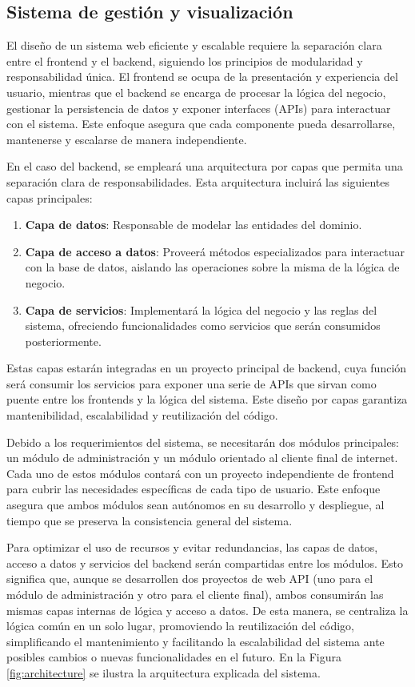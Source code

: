 \subsection{Sistema de gestión y visualización}
El diseño de un sistema web eficiente y escalable requiere la separación clara entre el frontend y el backend, 
siguiendo los principios de modularidad y responsabilidad única. El frontend se ocupa de la presentación y 
experiencia del usuario, mientras que el backend se encarga de procesar la lógica del negocio, gestionar la 
persistencia de datos y exponer interfaces (APIs) para interactuar con el sistema. Este enfoque asegura que 
cada componente pueda desarrollarse, mantenerse y escalarse de manera independiente.

En el caso del backend, se empleará una arquitectura por capas que permita una separación clara de responsabilidades. 
Esta arquitectura incluirá las siguientes capas principales:

\begin{enumerate}
    \item \textbf{Capa de datos}: Responsable de modelar las entidades del dominio.
    \item \textbf{Capa de acceso a datos}: Proveerá métodos especializados para interactuar con la base de datos, 
    aislando las operaciones sobre la misma de la lógica de negocio.
    \item \textbf{Capa de servicios}: Implementará la lógica del negocio y las reglas del sistema, ofreciendo 
    funcionalidades como servicios que serán consumidos posteriormente.
\end{enumerate}

Estas capas estarán integradas en un proyecto principal de backend, cuya función será consumir los servicios para exponer una serie de APIs 
que sirvan como puente entre los frontends y la lógica del sistema. Este diseño por capas garantiza mantenibilidad, 
escalabilidad y reutilización del código.

Debido a los requerimientos del sistema, se necesitarán dos módulos principales: un módulo de administración y 
un módulo orientado al cliente final de internet. Cada uno de estos módulos contará con un proyecto independiente 
de frontend para cubrir las necesidades específicas de cada tipo de usuario. Este enfoque asegura que ambos 
módulos sean autónomos en su desarrollo y despliegue, al tiempo que se preserva la consistencia general del sistema.

Para optimizar el uso de recursos y evitar redundancias, las capas de datos, acceso a datos y servicios del backend 
serán compartidas entre los módulos. Esto significa que, aunque se desarrollen dos proyectos de web API 
(uno para el módulo de administración y otro para el cliente final), ambos consumirán las mismas capas internas de 
lógica y acceso a datos. De esta manera, se centraliza la lógica común en un solo lugar, promoviendo la 
reutilización del código, simplificando el mantenimiento y facilitando la escalabilidad del sistema ante posibles 
cambios o nuevas funcionalidades en el futuro. En la Figura \ref{fig:architecture} se ilustra la arquitectura explicada del sistema.

